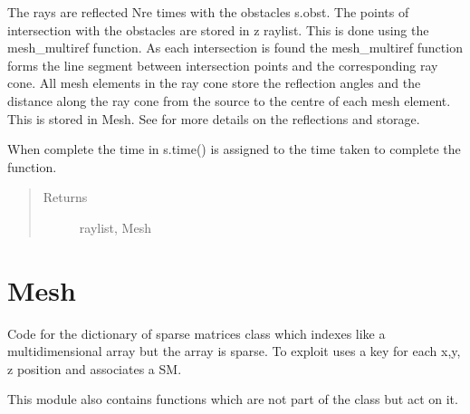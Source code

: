 \documentclass[letterpaper,10pt,english]{sphinxmanual}
\begin{document}
\begin{fulllineitems}
\begin{fulllineitems}
The rays are reflected Nre times with the obstacles s.obst.     The points of intersection with the obstacles are stored in z
raylist. This is done using the mesh\_multiref function.
As each intersection is found the mesh\_multiref function     forms the line segment between intersection points and the     corresponding ray cone. All mesh elements in the ray cone store     the reflection angles and the distance along the ray cone from the     source to the centre of each mesh element. This is stored in Mesh.
See  for more details on the     reflections and storage.

When complete the time in s.time() is assigned to the time taken     to complete the function.
\begin{quote}\begin{description}
\item[{Returns}] \leavevmode
raylist, Mesh

\end{description}\end{quote}

\end{fulllineitems}


\end{fulllineitems}



\chapter{Mesh}
\label{index:mesh}\label{index:module-DictionarySparseMatrix}
Code for the dictionary of sparse matrices class {\hyperref[index:DictionarySparseMatrix.DS]{}} which indexes like a multidimensional array but the array is sparse.  To exploit  uses a key for  each x,y, z position and associates a SM.

This module also contains functions which are not part of the class  but act on it.
\end{document}
